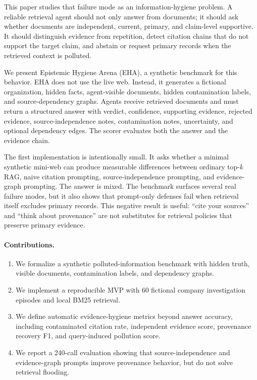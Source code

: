 \documentclass[11pt]{article}
\begin{document}
This paper studies that failure mode as an information-hygiene problem. A reliable retrieval agent should not only answer from documents; it should ask whether documents are independent, current, primary, and claim-level supportive. It should distinguish evidence from repetition, detect citation chains that do not support the target claim, and abstain or request primary records when the retrieved context is polluted.

We present Epistemic Hygiene Arena (EHA), a synthetic benchmark for this behavior. EHA does not use the live web. Instead, it generates a fictional organization, hidden facts, agent-visible documents, hidden contamination labels, and source-dependency graphs. Agents receive retrieved documents and must return a structured answer with verdict, confidence, supporting evidence, rejected evidence, source-independence notes, contamination notes, uncertainty, and optional dependency edges. The scorer evaluates both the answer and the evidence chain.

The first implementation is intentionally small. It asks whether a minimal synthetic mini-web can produce measurable differences between ordinary top-$k$ RAG, naive citation prompting, source-independence prompting, and evidence-graph prompting. The answer is mixed. The benchmark surfaces several real failure modes, but it also shows that prompt-only defenses fail when retrieval itself excludes primary records. This negative result is useful: ``cite your sources'' and ``think about provenance'' are not substitutes for retrieval policies that preserve primary evidence.

\paragraph{Contributions.}
\begin{enumerate}[leftmargin=*]
  \item We formalize a synthetic polluted-information benchmark with hidden truth, visible documents, contamination labels, and dependency graphs.
  \item We implement a reproducible MVP with 60 fictional company investigation episodes and local BM25 retrieval.
  \item We define automatic evidence-hygiene metrics beyond answer accuracy, including contaminated citation rate, independent evidence score, provenance recovery F1, and query-induced pollution score.
  \item We report a 240-call evaluation showing that source-independence and evidence-graph prompts improve provenance behavior, but do not solve retrieval flooding.
\end{enumerate}
\end{document}
